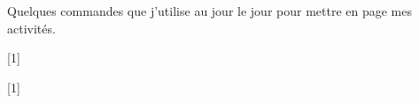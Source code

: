 \documentclass[12pt]{extarticle}
\begin{document}
\begin{center}
  Quelques commandes que j'utilise au jour le jour pour mettre en page mes activités.
\end{center}

\tableofcontents
\newpage


\renewcommand{\etablissement}{Documentation}
[1]
\begin{boiteCodeTex}{}
  \renewcommand{\etablissement}{Documentation}
  [1]
\end{boiteCodeTex}


\newpage

\newpage

\newpage

\newpage

\end{document}
